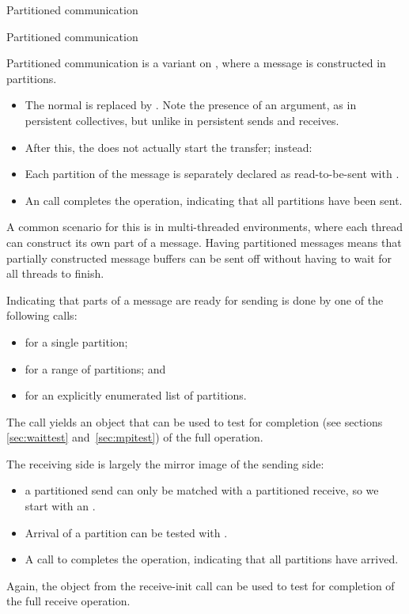  {Partitioned communication}
\begin{mpifournote}{Partitioned communication}
\label{sec:psend}

Partitioned communication is a variant
on ,
where a message is constructed in partitions.
\begin{itemize}
\item The normal  is replaced
  by .
  Note the presence of an  argument,
  as in persistent collectives, but unlike in persistent sends and receives.
\item After this, the  does not
  actually start the transfer; instead:
\item Each partition of the message is separately
  declared as read-to-be-sent with .
\item An  call completes the operation,
  indicating that all partitions have been sent.
\end{itemize}
A common scenario for this is in multi-threaded environments,
where each thread can construct its own part of a message.
Having partitioned messages means that partially constructed message buffers
can be sent off without having to wait for all threads to finish.

Indicating that parts of a message are ready for sending
is done by one of the following calls:
\begin{itemize}
\item {} for a single partition;
\item {} for a range of partitions; and
\item {} for an explicitly enumerated list of partitions.
\end{itemize}
The  call yields an  object
that can be used to test for completion
(see sections \ref{sec:waittest} and~\ref{sec:mpitest})
of the full operation.


The receiving side is largely the mirror image of the sending side:
%
%
\begin{itemize}
\item a partitioned send can only be matched with a partitioned receive,
  so we start with an . 
\item Arrival of a partition can be tested with .
\item A call to  completes the operation,
  indicating that all partitions have arrived.
\end{itemize}
Again, the  object from the receive-init call can
be used to test for completion of the full receive operation.

\end{mpifournote}

